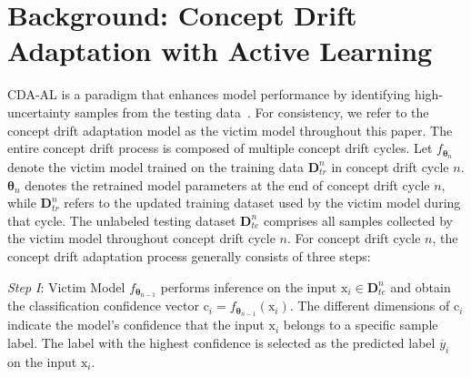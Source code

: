 
\section{Background: Concept Drift Adaptation with Active Learning}
\label{Sec: Concept Drift Adaptation}

CDA-AL is a paradigm that enhances model performance by identifying high-uncertainty samples from the testing data~\cite{2023-Usenix-chenyizhen,park2016active,vzliobaite2013active}.
For consistency, we refer to the concept drift adaptation model as the victim model throughout this paper.
The entire concept drift process is composed of multiple concept drift cycles.
Let $f_{\bm{\theta}_{n}}$ denote the victim model trained on the training data $\bm{D}^{n}_{tr}$ in concept drift cycle $n$.
$\bm{\theta}_{n}$ denotes the retrained model parameters at the end of concept drift cycle $n$, while $\bm{D}^{n}_{tr}$ refers to the updated training dataset used by the victim model during that cycle.
The unlabeled testing dataset $\bm{D}_{te}^{n}$ comprises all samples collected by the victim model throughout concept drift cycle $n$.
For concept drift cycle $n$, the concept drift adaptation process generally consists of three steps:

\emph{Step I}: Victim Model $f_{\bm{\theta}_{n-1}}$ performs inference on the input $\bm{\mathrm{x}}_{i} \in \bm{D}_{te}^{n}$ and obtain the classification confidence vector $\bm{\mathrm{c}}_{i} = f_{\bm{\theta}_{n-1}} \left( \bm{\mathrm{x}}_{i} \right)$.
	The different dimensions of $\bm{\mathrm{c}}_{i}$ indicate the model's confidence that the input $\bm{\mathrm{x}}_{i}$ belongs to a specific sample label. 
	The label with the highest confidence is selected as the predicted label $\overline{y}_{i}$ on the input $\bm{\mathrm{x}}_{i}$.

